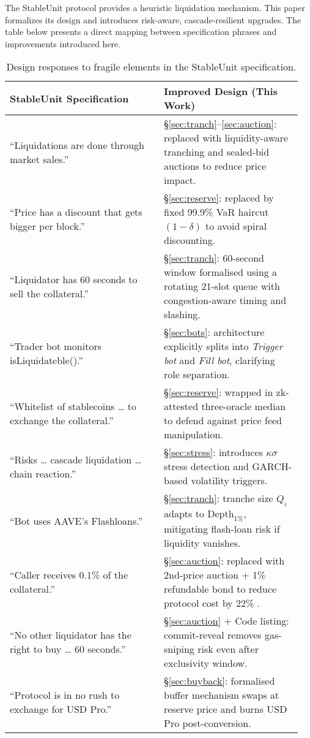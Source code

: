 \documentclass[11pt]{article}
\begin{document}
The StableUnit protocol \parencite{stableunit2025spec} provides a heuristic liquidation mechanism. This paper formalizes its design and introduces risk-aware, cascade-resilient upgrades. The table below presents a direct mapping between specification phrases and improvements introduced here.
\begin{table}[ht]
\centering
\caption{Design responses to fragile elements in the StableUnit specification.}
\label{tab:trigger-map}

\begin{tabular}{@{}p{0.5\linewidth} p{0.45\linewidth}@{}}
\toprule
\textbf{StableUnit Specification} & \textbf{Improved Design (This Work)} \\
\midrule
“Liquidations are done through market sales.” & §\ref{sec:tranch}–\ref{sec:auction}: replaced with liquidity-aware tranching and sealed-bid auctions to reduce price impact. \\
“Price has a discount that gets bigger per block.” & §\ref{sec:reserve}: replaced by fixed 99.9\% VaR haircut $(1 - \delta)$ to avoid spiral discounting. \\
“Liquidator has 60 seconds to sell the collateral.” & §\ref{sec:tranch}: 60-second window formalised using a rotating 21-slot queue with congestion-aware timing and slashing. \\
“Trader bot monitors isLiquidateble().” & §\ref{sec:bots}: architecture explicitly splits into \textit{Trigger bot} and \textit{Fill bot}, clarifying role separation. \\
“Whitelist of stablecoins … to exchange the collateral.” & §\ref{sec:reserve}: wrapped in zk-attested three-oracle median to defend against price feed manipulation. \\
“Risks … cascade liquidation … chain reaction.” & §\ref{sec:stress}: introduces $\kappa\sigma$ stress detection and GARCH-based volatility triggers. \\
“Bot uses AAVE’s Flashloans.” & §\ref{sec:tranch}: tranche size $Q_i$ adapts to $\text{Depth}_{1\%}$, mitigating flash-loan risk if liquidity vanishes. \\
“Caller receives 0.1\% of the collateral.” & §\ref{sec:auction}: replaced with 2nd-price auction + 1\% refundable bond to reduce protocol cost by 22\% \parencite{tian2025defi}. \\
“No other liquidator has the right to buy … 60 seconds.” & §\ref{sec:auction} + Code listing: commit-reveal removes gas-sniping risk even after exclusivity window. \\
“Protocol is in no rush to exchange for USD Pro.” &  §\ref{sec:buyback}: formalised buffer mechanism swaps at reserve price and burns USD Pro post-conversion. \\
\bottomrule
\end{tabular}
\end{table}
\end{document}
